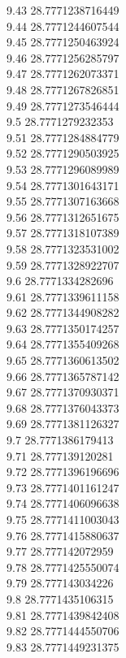 {9.43	28.7771238716449\\
9.44	28.7771244607544\\
9.45	28.7771250463924\\
9.46	28.7771256285797\\
9.47	28.7771262073371\\
9.48	28.7771267826851\\
9.49	28.7771273546444\\
9.5	28.7771279232353\\
9.51	28.7771284884779\\
9.52	28.7771290503925\\
9.53	28.7771296089989\\
9.54	28.7771301643171\\
9.55	28.7771307163668\\
9.56	28.7771312651675\\
9.57	28.7771318107389\\
9.58	28.7771323531002\\
9.59	28.7771328922707\\
9.6	28.7771334282696\\
9.61	28.7771339611158\\
9.62	28.7771344908282\\
9.63	28.7771350174257\\
9.64	28.7771355409268\\
9.65	28.7771360613502\\
9.66	28.7771365787142\\
9.67	28.7771370930371\\
9.68	28.7771376043373\\
9.69	28.7771381126327\\
9.7	28.7771386179413\\
9.71	28.777139120281\\
9.72	28.7771396196696\\
9.73	28.7771401161247\\
9.74	28.7771406096638\\
9.75	28.7771411003043\\
9.76	28.7771415880637\\
9.77	28.777142072959\\
9.78	28.7771425550074\\
9.79	28.777143034226\\
9.8	28.7771435106315\\
9.81	28.7771439842408\\
9.82	28.7771444550706\\
9.83	28.7771449231375\\
}
